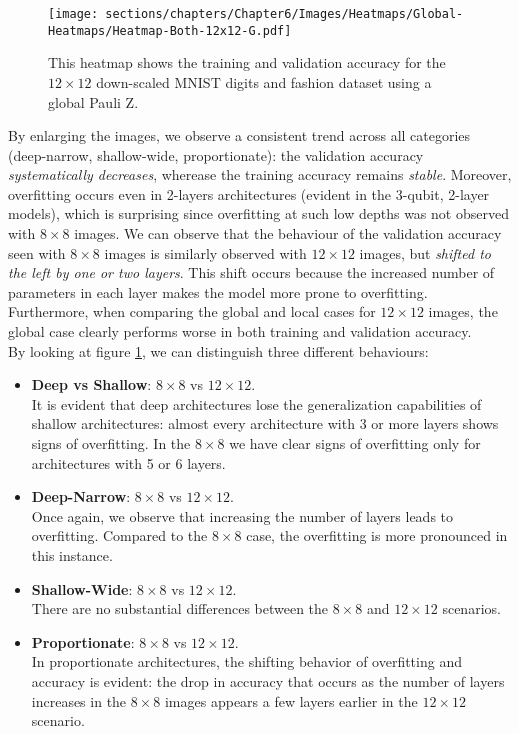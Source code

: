 \begin{figure}[h]
    \centering
    \texttt{[image: sections/chapters/Chapter6/Images/Heatmaps/Global-Heatmaps/Heatmap-Both-12x12-G.pdf]}
    \caption{This heatmap shows the training and validation accuracy for the $12\times12$ 
    down-scaled MNIST digits and fashion dataset using a global Pauli Z.}
    \label{fig:heatmap-12x12-G}
\end{figure}

By enlarging the images, we observe a consistent trend across all categories 
(deep-narrow, shallow-wide, proportionate): the validation accuracy \textit{systematically decreases}, 
wherease the training accuracy remains \textit{stable}.
Moreover, overfitting occurs even in 2-layers architectures (evident in the 3-qubit, 2-layer models), 
which is surprising since overfitting at such low depths was not observed with $8\times8$ images.
We can observe that the behaviour of the validation accuracy seen with $8\times8$ images is similarly 
observed with $12\times12$ images, but \textit{shifted to the left by one or two layers}. 
This shift occurs because the increased number of parameters in each layer makes the model more prone to 
overfitting.\\
Furthermore, when comparing the global and local cases for $12\times12$ images, the global 
case clearly performs worse in both training and validation accuracy.\\
By looking at figure \ref{fig:heatmap-12x12-G}, we can distinguish 
three different behaviours:

\begin{itemize}
    \item \textbf{Deep vs Shallow}: $8\times8$ vs $12\times12$.\\
    It is evident that deep architectures lose the generalization capabilities of shallow architectures:
    almost every architecture with 3 or more layers shows signs of overfitting.
    In the $8\times8$ we have clear signs of overfitting only for architectures with 5 or 6 layers.
    \item \textbf{Deep-Narrow}: $8\times8$ vs $12\times12$.\\
    Once again, we observe that increasing the number of layers leads to overfitting. 
    Compared to the $8 \times 8$ case, the overfitting is more pronounced in this instance.
    \item \textbf{Shallow-Wide}: $8\times8$ vs $12\times12$.\\
    There are no substantial differences between the $8\times8$ and $12\times12$ scenarios.
    \item \textbf{Proportionate}: $8\times8$ vs $12\times12$.\\
    In proportionate architectures, the shifting behavior of overfitting and accuracy 
    is evident: the drop in accuracy that occurs as the number of layers increases in the $8 \times 8$ 
    images appears a few layers earlier in the $12 \times 12$ scenario.
 \end{itemize}